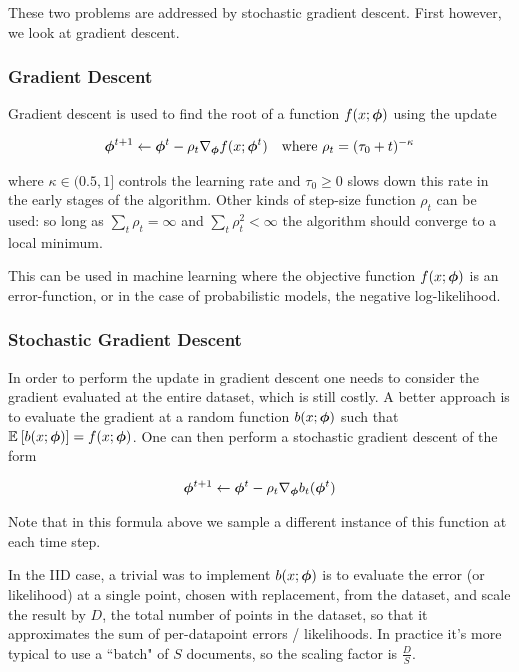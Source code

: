 These two problems are addressed by stochastic gradient descent. First however, we look at gradient descent.

\subsubsection*{Gradient Descent}
Gradient descent is used to find the root of a function $f(x; { \bm \phi })$ using the update

\begin{align*}
{  \bm \phi  }^{t+1} & \leftarrow {  \bm \phi  }^t - \rho_t \nabla_{ \bm \phi } f(x; { \bm \phi }^t) &
\text{where } \rho_t = (\tau_0 + t)^{-\kappa}
\end{align*}

where $\kappa \in (0.5,1]$ controls the learning rate and $\tau_0 \geq 0$ slows down this rate in the early stages of the algorithm. Other kinds of step-size function $\rho_t$ can be used: so long as $\sum_t \rho_t = \infty$ and $\sum_t \rho^2_t < \infty$ the algorithm should converge to a local minimum\cite{RobbinsMonro1951}. 

This can be used in machine learning where the objective function $f(x; { \bm \phi })$ is an error-function, or in the case of probabilistic models, the negative log-likelihood.

\subsubsection*{Stochastic Gradient Descent}
In order to perform the update in gradient descent one needs to consider the gradient evaluated at the entire dataset, which is still costly. A better approach is to evaluate the gradient at a random function $b(x; { \bm \phi })$ such that $\mathbb{E}_{ {  } }\left[ b(x; { \bm \phi }) \right] = f(x; { \bm \phi })$. One can then perform a stochastic gradient descent of the form

\begin{align*}
{  \bm \phi  }^{t+1} \leftarrow {  \bm \phi  }^t - \rho_t \nabla_{ \bm \phi } b_t({ \bm \phi }^t)
\end{align*}

Note that in this formula above we sample a different instance of this function at each time step. 

In the IID case, a trivial was to implement $b(x; { \bm \phi })$ is to evaluate the error (or likelihood) at a single point, chosen with replacement, from the dataset, and scale the result by $D$, the total number of points in the dataset, so that it approximates the sum of per-datapoint errors / likelihoods. In practice it's more typical to use a ``batch" of $S$ documents, so the scaling factor is $\frac{D}{S}$.

